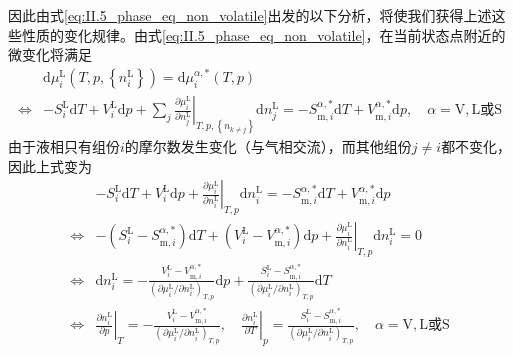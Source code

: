 \documentclass[main.tex]{subfiles}
\begin{document}
因此由式\eqref{eq:II.5_phase_eq_non_volatile}出发的以下分析，将使我们获得上述这些性质的变化规律。由式\eqref{eq:II.5_phase_eq_non_volatile}，在当前状态点附近的微变化将满足
\begin{align*}
                    & \mathrm{d}\mu_i^\text{L}\left(T,p,\left\{n_i^\text{L}\right\}\right)=\mathrm{d}\mu_i^{\alpha,*}\left(T,p\right)                                                                                                                                                                             \\
    \Leftrightarrow & -S_i^\text{L}\mathrm{d}T+V_i^\text{L}\mathrm{d}p+\sum_j\left.\frac{\partial \mu_i^\text{L}}{\partial n_j^\text{L}}\right|_{T,p,\left\{n_{k\neq j}\right\}}\mathrm{d}n_j^\text{L}=-S_{\text{m},i}^{\alpha,*}\mathrm{d}T+V_{\text{m},i}^{\alpha,*}\mathrm{d}p,\quad\alpha=\text{V},\text{L或S}
\end{align*}
由于液相只有组份$i$的摩尔数发生变化（与气相交流），而其他组份$j\neq i$都不变化，因此上式变为
\begin{align*}
                    & -S_i^\text{L}\mathrm{d}T+V_i^\text{L}\mathrm{d}p+\left.\frac{\partial\mu_i^\text{L}}{\partial n_i^\text{L}}\right|_{T,p}\mathrm{d}n_i^\text{L}=-S_{\text{m},i}^{\alpha,*}\mathrm{d}T+V_{\text{m},i}^{\alpha,*}\mathrm{d}p                                                                                                                                                               \\
    \Leftrightarrow & -\left(S_i^\text{L}-S_{\text{m},i}^{\alpha,*}\right)\mathrm{d}T+\left(V_i^\text{L}-V_{\text{m},i}^{\alpha,*}\right)\mathrm{d}p+\left.\frac{\partial \mu_i^\text{L}}{\partial n_i^\text{L}}\right|_{T,p}\mathrm{d}n_i^\text{L}=0                                                                                                                                                         \\
    \Leftrightarrow & \mathrm{d}n_i^\text{L}=-\frac{V_i^\text{L}-V_{\text{m},i}^{\alpha,*}}{\left(\partial\mu_i^\text{L}/\partial n_i^\text{L}\right)_{T,p}}\mathrm{d}p+\frac{S_i^\text{L}-S_{\text{m},i}^{\alpha,*}}{\left(\partial\mu_i^\text{L}/\partial n_i^\text{L}\right)_{T,p}} \mathrm{d}T                                                                                                            \\
    \Leftrightarrow & \left.\frac{\partial n_i^\text{L}}{\partial p}\right|_{T}=-\frac{V_i^\text{L}-V_{\text{m},i}^{\alpha,*}}{\left(\partial\mu_i^\text{L}/\partial n_i^\text{L}\right)_{T,p}},\quad\left.\frac{\partial n_i^\text{L}}{\partial T}\right|_{p}=\frac{S_i^\text{L}-S_{\text{m},i}^{\alpha,*}}{\left(\partial\mu_i^\text{L}/\partial n_i^\text{L}\right)_{T,p}},\quad\alpha=\text{V},\text{L或S}
\end{align*}
\end{document}
